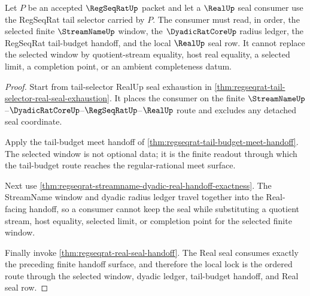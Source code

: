 \begin{theorem}
\label{thm:regseqrat-tail-selector-window-seal-lock}
Let $P$ be an accepted $\RegSeqRatUp$ packet and let a $\RealUp$ seal consumer use the RegSeqRat tail selector carried by $P$. The consumer must read, in order, the selected finite $\StreamNameUp$ window, the $\DyadicRatCoreUp$ radius ledger, the RegSeqRat tail-budget handoff, and the local $\RealUp$ seal row. It cannot replace the selected window by quotient-stream equality, host real equality, a selected limit, a completion point, or an ambient completeness datum.
\end{theorem}
\begin{proof}
Start from tail-selector RealUp seal exhaustion in \autoref{thm:regseqrat-tail-selector-real-seal-exhaustion}. It places the consumer on the finite $\StreamNameUp$--$\DyadicRatCoreUp$--$\RegSeqRatUp$--$\RealUp$ route and excludes any detached seal coordinate.

Apply the tail-budget meet handoff of \autoref{thm:regseqrat-tail-budget-meet-handoff}. The selected window is not optional data; it is the finite readout through which the tail-budget route reaches the regular-rational meet surface.

Next use \autoref{thm:regseqrat-streamname-dyadic-real-handoff-exactness}. The StreamName window and dyadic radius ledger travel together into the Real-facing handoff, so a consumer cannot keep the seal while substituting a quotient stream, host equality, selected limit, or completion point for the selected finite window.

Finally invoke \autoref{thm:regseqrat-real-seal-handoff}. The Real seal consumes exactly the preceding finite handoff surface, and therefore the local lock is the ordered route through the selected window, dyadic ledger, tail-budget handoff, and Real seal row.
\end{proof}
